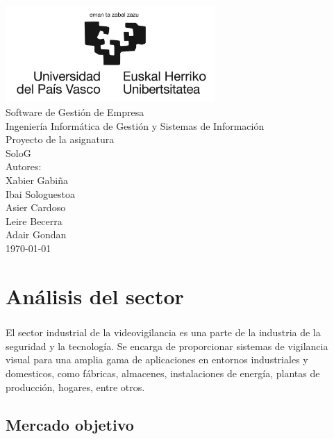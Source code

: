 \documentclass{report}
\begin{document}
    \begin{titlepage}
        \centering
        \includegraphics[width=0.6\textwidth]{./img/logo.jpg}\\
        \vspace{1cm}
        \LARGE Software de Gestión de Empresa\\
        \vspace{0.5cm}
        \Large Ingeniería Informática de Gestión y Sistemas de Información\\
        \vspace{3cm}
        \Huge Proyecto de la asignatura\\
        \huge SoloG\\
        \vspace{2.5cm}
        \Large Autores:\\
        \vspace{0.2cm}
        \large Xabier Gabiña\\
        \large Ibai Sologuestoa\\
        \large Asier Cardoso\\
        \large Leire Becerra\\
        \large Adair Gondan\\
        \vfill
        \today
    \end{titlepage}
    \tableofcontents
    \listoffigures
    \listoftables
    \chapter{Análisis del sector}
      \paragraph*{}{El sector industrial de la videovigilancia es una parte de la industria de la seguridad y la tecnología. Se encarga de proporcionar sistemas de vigilancia visual para una amplia gama de aplicaciones en entornos industriales y domesticos, como fábricas, almacenes, instalaciones de energía, plantas de producción, hogares, entre otros.}
      \section{Mercado objetivo}  
\end{document}
